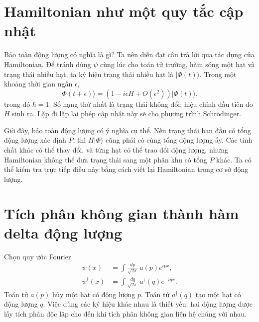 \section{Hamiltonian như một quy tắc cập nhật}

Bảo toàn động lượng có nghĩa là gì? Ta nên diễn đạt câu trả lời qua tác dụng của Hamiltonian. Để tránh dùng \(\psi\) cùng lúc cho toán tử trường, hàm sóng một hạt và trạng thái nhiều hạt, ta ký hiệu trạng thái nhiều hạt là \(\lvert\Phi(t)\rangle\). Trong một khoảng thời gian ngắn \(\epsilon\),
\begin{equation}
\lvert\Phi(t+\epsilon)\rangle
=\left(1-i\epsilon H+O(\epsilon^2)\right)
\lvert\Phi(t)\rangle,
\label{eq:l9-short-update}
\end{equation}
trong đó \(\hbar=1\). Số hạng thứ nhất là trạng thái không đổi; hiệu chỉnh đầu tiên do \(H\) sinh ra. Lặp đi lặp lại phép cập nhật này sẽ cho phương trình Schr\"odinger.

Giờ đây, bảo toàn động lượng có ý nghĩa cụ thể. Nếu trạng thái ban đầu có tổng động lượng xác định \(P\), thì \(H\lvert\Phi\rangle\) cũng phải có cùng tổng động lượng ấy. Các tính chất khác có thể thay đổi, và từng hạt có thể trao đổi động lượng, nhưng Hamiltonian không thể đưa trạng thái sang một phân khu có tổng \(P\) khác. Ta có thể kiểm tra trực tiếp điều này bằng cách viết lại Hamiltonian trong cơ sở động lượng.

\section{Tích phân không gian thành hàm delta động lượng}

Chọn quy ước Fourier
\begin{align}
\psi(x)&=\int\frac{dp}{\sqrt{2\pi}}\,a(p)e^{ipx},\\
\psi^\dagger(x)&=\int\frac{dq}{\sqrt{2\pi}}\,a^\dagger(q)e^{-iqx}.
\label{eq:l9-field-fourier}
\end{align}
Toán tử \(a(p)\) hủy một hạt có động lượng \(p\).
Toán tử \(a^\dagger(q)\) tạo một hạt có động lượng \(q\). Việc dùng các ký hiệu khác nhau là thiết yếu: hai động lượng được lấy tích phân độc lập cho đến khi tích phân không gian liên hệ chúng với nhau.


